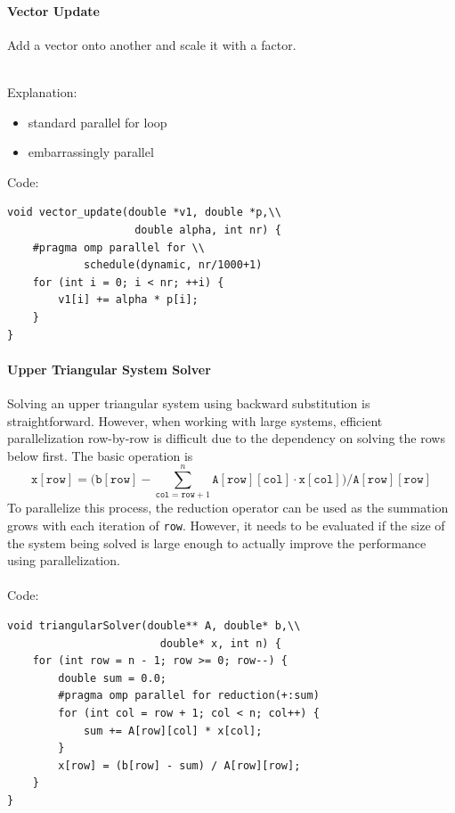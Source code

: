 \documentclass{article}
\begin{document}
\paragraph{Vector Update}
Add a vector onto another and scale it with a factor.\\\\
\begin{minipage}[t]{0.45\textwidth}
Explanation:
\begin{itemize}
    \item standard parallel for loop
    \item embarrassingly parallel
\end{itemize}
\end{minipage}
\hspace{.7cm}
\begin{minipage}[t]{0.35\textwidth}
Code:
\begin{verbatim}
void vector_update(double *v1, double *p,\\
                    double alpha, int nr) {
    #pragma omp parallel for \\
            schedule(dynamic, nr/1000+1)
    for (int i = 0; i < nr; ++i) {
        v1[i] += alpha * p[i];
    }
}

\end{verbatim}
\end{minipage}

\paragraph{Upper Triangular System Solver}
Solving an upper triangular system using backward substitution is straightforward. However, when working with large systems, efficient parallelization row-by-row is difficult due to the dependency on solving the rows below first. The basic operation is $$\mathtt{x[row]} = 
\big(\mathtt{b[row]}-\sum_{\mathtt{col} = \mathtt{row}+1}^{n} \mathtt{A[row][col]} \cdot \mathtt{x[col]}\big)/\mathtt{A[row][row]}$$
To parallelize this process, the reduction operator can be used as the summation grows with each iteration of \lstinline|row|. However, it needs to be evaluated if the size of the system being solved is large enough to actually improve the performance using parallelization. \\\\
Code:
\begin{verbatim}
void triangularSolver(double** A, double* b,\\
                        double* x, int n) {
    for (int row = n - 1; row >= 0; row--) {
        double sum = 0.0;
        #pragma omp parallel for reduction(+:sum)
        for (int col = row + 1; col < n; col++) {
            sum += A[row][col] * x[col];
        }
        x[row] = (b[row] - sum) / A[row][row];
    }
}


\end{verbatim}
\end{document}
